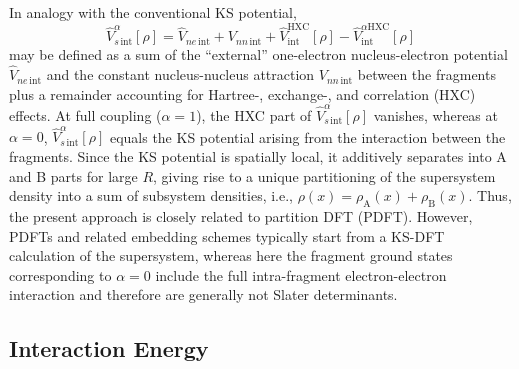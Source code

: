 \documentclass[journal=jctcce,manuscript=article]{achemso}
\begin{document}
In analogy with the conventional KS potential,
  \begin{equation}
    \label{eq:vsdef}
    \hat{V}_{s\,\text{int}}^\alpha[\rho] =  \hat{V}_{ne
        \,\text{int}} + V_{nn \,\text{int}} +
    \hat{V}_{\text{int}}^{\text{HXC}}[\rho] -
    \hat{V}_{\text{int}}^{\alpha\text{HXC}}[\rho]
  \end{equation}
may be defined as a sum of the ``external'' one-electron
nucleus-electron potential $\hat{V}_{ne\,\text{int}}$ and the constant
nucleus-nucleus attraction $V_{nn \,\text{int}}$ between the fragments
plus a remainder accounting for Hartree-, exchange-, and correlation
(HXC) effects. At full coupling ($\alpha=1$), the HXC part of
$\hat{V}_{s\,\text{int}}^\alpha[\rho]$ vanishes, whereas at $\alpha=0$,
$\hat{V}_{s\,\text{int}}^\alpha[\rho]$ equals  
the KS potential arising from the interaction between the
fragments. Since the KS 
potential is spatially local, it additively separates into A and B parts for
large $R$, giving rise to a unique partitioning of the supersystem
density into a sum of
subsystem densities, i.e., $\rho(x) = \rho_{\text{A}}(x)+\rho_{\text{B}}(x)$. 
Thus, the present approach is closely related to
partition DFT (PDFT).\cite{Cohen2006,PhysRevA.82.024501} However,
PDFTs\cite{doi:10.1002/wcms.1164,PhysRevLett.91.033201} and related embedding
schemes\cite{doi:10.1021/j100132a040,doi:10.1063/1.4890839}
typically start from a KS-DFT calculation of the supersystem, whereas here the
fragment ground states corresponding to $\alpha=0$ include the full
intra-fragment electron-electron interaction and therefore are
generally not Slater determinants.

\subsection{Interaction Energy}
\end{document}
